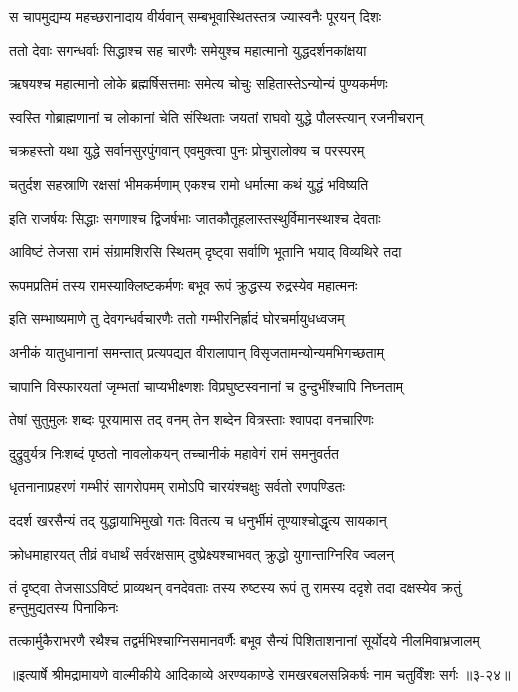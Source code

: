 \twolineshloka
{स चापमुद्यम्य महच्छरानादाय वीर्यवान्}
{सम्बभूवास्थितस्तत्र ज्यास्वनैः पूरयन् दिशः} %

\twolineshloka
{ततो देवाः सगन्धर्वाः सिद्धाश्च सह चारणैः}
{समेयुश्च महात्मानो युद्धदर्शनकांक्षया} %

\twolineshloka
{ऋषयश्च महात्मानो लोके ब्रह्मर्षिसत्तमाः}
{समेत्य चोचुः सहितास्तेऽन्योन्यं पुण्यकर्मणः} %

\twolineshloka
{स्वस्ति गोब्राह्मणानां च लोकानां चेति संस्थिताः}
{जयतां राघवो युद्धे पौलस्त्यान् रजनीचरान्} %

\twolineshloka
{चक्रहस्तो यथा युद्धे सर्वानसुरपुंगवान्}
{एवमुक्त्वा पुनः प्रोचुरालोक्य च परस्परम्} %

\twolineshloka
{चतुर्दश सहस्राणि रक्षसां भीमकर्मणाम्}
{एकश्च रामो धर्मात्मा कथं युद्धं भविष्यति} %

\twolineshloka
{इति राजर्षयः सिद्धाः सगणाश्च द्विजर्षभाः}
{जातकौतूहलास्तस्थुर्विमानस्थाश्च देवताः} %

\twolineshloka
{आविष्टं तेजसा रामं संग्रामशिरसि स्थितम्}
{दृष्ट्वा सर्वाणि भूतानि भयाद् विव्यथिरे तदा} %

\twolineshloka
{रूपमप्रतिमं तस्य रामस्याक्लिष्टकर्मणः}
{बभूव रूपं क्रुद्धस्य रुद्रस्येव महात्मनः} %

\twolineshloka
{इति सम्भाष्यमाणे तु देवगन्धर्वचारणैः}
{ततो गम्भीरनिर्ह्रादं घोरचर्मायुधध्वजम्} %

\twolineshloka
{अनीकं यातुधानानां समन्तात् प्रत्यपद्यत}
{वीरालापान् विसृजतामन्योन्यमभिगच्छताम्} %

\twolineshloka
{चापानि विस्फारयतां जृम्भतां चाप्यभीक्ष्णशः}
{विप्रघुष्टस्वनानां च दुन्दुभींश्चापि निघ्नताम्} %

\twolineshloka
{तेषां सुतुमुलः शब्दः पूरयामास तद् वनम्}
{तेन शब्देन वित्रस्ताः श्वापदा वनचारिणः} %

\twolineshloka
{दुद्रुवुर्यत्र निःशब्दं पृष्ठतो नावलोकयन्}
{तच्चानीकं महावेगं रामं समनुवर्तत} %

\twolineshloka
{धृतनानाप्रहरणं गम्भीरं सागरोपमम्}
{रामोऽपि चारयंश्चक्षुः सर्वतो रणपण्डितः} %

\twolineshloka
{ददर्श खरसैन्यं तद् युद्धायाभिमुखो गतः}
{वितत्य च धनुर्भीमं तूण्याश्चोद्धृत्य सायकान्} %

\twolineshloka
{क्रोधमाहारयत् तीव्रं वधार्थं सर्वरक्षसाम्}
{दुष्प्रेक्ष्यश्चाभवत् क्रुद्धो युगान्ताग्निरिव ज्वलन्} %

\threelineshloka
{तं दृष्ट्वा तेजसाऽऽविष्टं प्राव्यथन् वनदेवताः}
{तस्य रुष्टस्य रूपं तु रामस्य ददृशे तदा}
{दक्षस्येव क्रतुं हन्तुमुद्यतस्य पिनाकिनः} %

\twolineshloka
{तत्कार्मुकैराभरणै रथैश्च तद्वर्मभिश्चाग्निसमानवर्णैः}
{बभूव सैन्यं पिशिताशनानां सूर्योदये नीलमिवाभ्रजालम्} %


॥इत्यार्षे श्रीमद्रामायणे वाल्मीकीये आदिकाव्ये अरण्यकाण्डे रामखरबलसन्निकर्षः नाम चतुर्विंशः सर्गः ॥३-२४॥
